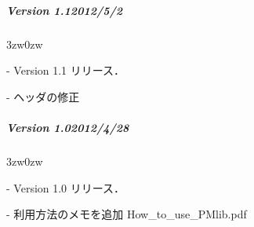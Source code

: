 
{\small

%

%
\subparagraph{Version 1.1\hspace{1cm}2012/5/2}

\begin{description}
\begin{indentation}{3zw}{0zw}
\item[-] Version 1.1 リリース．
\item[-] ヘッダの修正
\end{indentation}
\end{description}
\vspace{3mm}


\subparagraph{Version 1.0\hspace{1cm}2012/4/28}

\begin{description}
\begin{indentation}{3zw}{0zw}
\item[-] Version 1.0 リリース．
\item[-] 利用方法のメモを追加 How\_to\_use\_PMlib.pdf
\end{indentation}
\end{description}
\vspace{3mm}

} %